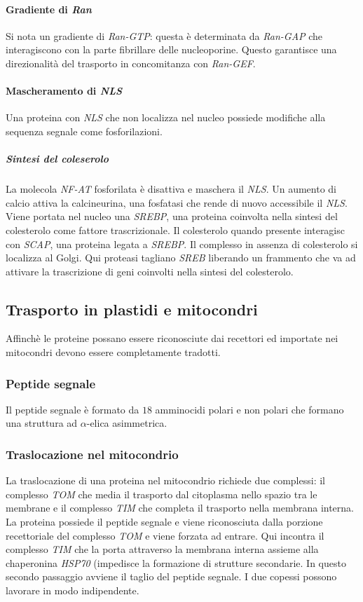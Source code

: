 			\paragraph{Gradiente di \emph{Ran}}
			Si nota un gradiente di \emph{Ran-GTP}: questa \`e determinata da \emph{Ran-GAP} che interagiscono con la parte fibrillare delle nucleoporine.
			Questo garantisce una direzionalit\`a del trasporto in concomitanza con \emph{Ran-GEF}.

			\paragraph{Mascheramento di \emph{NLS}}
			Una proteina con \emph{NLS} che non localizza nel nucleo possiede modifiche alla sequenza segnale come fosforilazioni.
	
				\subparagraph{Sintesi del coleserolo}
				La molecola \emph{NF-AT} fosforilata \`e disattiva e maschera il \emph{NLS}.
				Un aumento di calcio attiva la calcineurina, una fosfatasi che rende di nuovo accessibile il \emph{NLS}.
				Viene portata nel nucleo una \emph{SREBP}, una proteina coinvolta nella sintesi del colesterolo come fattore trascrizionale.
				Il colesterolo quando presente interagisc con \emph{SCAP}, una proteina legata a \emph{SREBP}.
				Il complesso in assenza di colesterolo si localizza al Golgi.
				Qui proteasi tagliano \emph{SREB} liberando un frammento che va ad attivare la trascrizione di geni coinvolti nella sintesi del colesterolo.



	\subsection{Trasporto in plastidi e mitocondri}
	Affinch\`e le proteine possano essere riconosciute dai recettori ed importate nei mitocondri devono essere completamente tradotti.

		\subsubsection{Peptide segnale}
		Il peptide segnale \`e formato da $18$ amminocidi polari e non polari che formano una struttura ad $\alpha$-elica asimmetrica.

		\subsubsection{Traslocazione nel mitocondrio}
		La traslocazione di una proteina nel mitocondrio richiede due complessi: il complesso \emph{TOM} che media il trasporto dal citoplasma nello spazio tra le membrane e il complesso \emph{TIM} che completa il trasporto nella membrana interna.
		La proteina possiede il peptide segnale e viene riconosciuta dalla porzione recettoriale del complesso \emph{TOM} e viene forzata ad entrare.
		Qui incontra il complesso \emph{TIM} che la porta attraverso la membrana interna assieme alla chaperonina \emph{HSP70} (impedisce la formazione di strutture secondarie.
		In questo secondo passaggio avviene il taglio del peptide segnale.
		I due copessi possono lavorare in modo indipendente.


